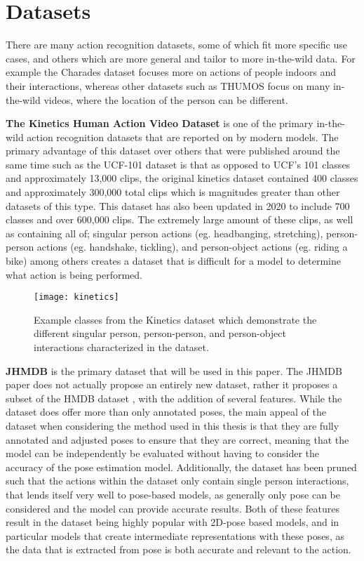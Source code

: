 \section{Datasets}

There are many action recognition datasets, some of which fit more specific use cases, and others which are more general and tailor to more in-the-wild data. For example the Charades dataset \cite{charades} focuses more on actions of people indoors and their interactions, whereas other datasets such as THUMOS \cite{THUMOS15} focus on many in-the-wild videos, where the location of the person can be different.

\textbf{The Kinetics Human Action Video Dataset} \cite{kinetics} is one of the primary in-the-wild action recognition datasets that are reported on by modern models. The primary advantage of this dataset over others that were published around the same time such as the UCF-101 dataset \cite{ucf101} is that as opposed to UCF's 101 classes and approximately 13,000 clips, the original kinetics dataset contained 400 classes and approximately 300,000 total clips which is magnitudes greater than other datasets of this type. This dataset has also been updated in 2020 to include 700 classes and over 600,000 clips. The extremely large amount of these clips, as well as containing all of; singular person actions (eg. headbanging, stretching), person-person actions (eg. handshake, tickling), and person-object actions (eg. riding a bike) among others creates a dataset that is difficult for a model to determine what action is being performed.

\begin{figure}[h]
	\texttt{[image: kinetics]}
	\centering
	\caption{Example classes from the Kinetics dataset \cite{kinetics} which demonstrate the different singular person, person-person, and person-object interactions characterized in the dataset.}
	\label{fig:kinetics}
\end{figure}

\textbf{JHMDB} \cite{JHMDB} is the primary dataset that will be used in this paper. The JHMDB paper does not actually propose an entirely new dataset, rather it proposes a subset of the HMDB dataset \cite{hmdb}, with the addition of several features. While the dataset does offer more than only annotated poses, the main appeal of the dataset when considering the method used in this thesis is that they are fully annotated and adjusted poses to ensure that they are correct, meaning that the model can be independently be evaluated without having to consider the accuracy of the pose estimation model. Additionally, the dataset has been pruned such that the actions within the dataset only contain single person interactions, that lends itself very well to pose-based models, as generally only pose can be considered and the model can provide accurate results. Both of these features result in the dataset being highly popular with 2D-pose based models, and in particular models that create intermediate representations with these poses, as the data that is extracted from pose is both accurate and relevant to the action.

